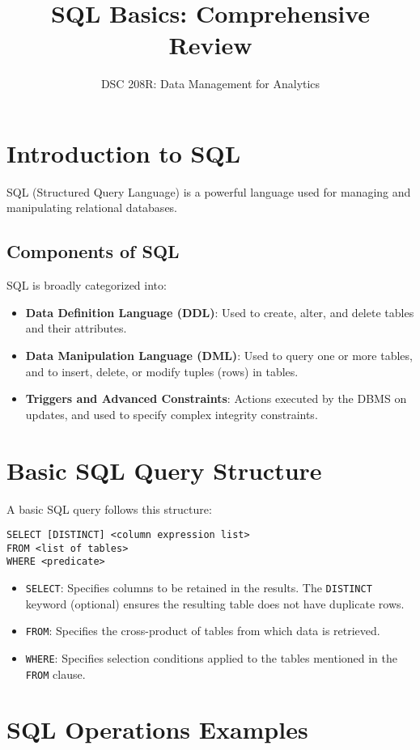 \documentclass{article}
\title{SQL Basics: Comprehensive Review}
\author{DSC 208R: Data Management for Analytics}
\date{}
\begin{document}
\maketitle

\section*{Introduction to SQL}
SQL (Structured Query Language) is a powerful language used for managing and manipulating relational databases.

\subsection*{Components of SQL}
SQL is broadly categorized into:
\begin{itemize}
    \item \textbf{Data Definition Language (DDL)}: Used to create, alter, and delete tables and their attributes.
    \item \textbf{Data Manipulation Language (DML)}: Used to query one or more tables, and to insert, delete, or modify tuples (rows) in tables.
    \item \textbf{Triggers and Advanced Constraints}: Actions executed by the DBMS on updates, and used to specify complex integrity constraints.
\end{itemize}

\section*{Basic SQL Query Structure}
A basic SQL query follows this structure:
\begin{lstlisting}
SELECT [DISTINCT] <column expression list>
FROM <list of tables>
WHERE <predicate>
\end{lstlisting}
\begin{itemize}
    \item \texttt{SELECT}: Specifies columns to be retained in the results. The \texttt{DISTINCT} keyword (optional) ensures the resulting table does not have duplicate rows.
    \item \texttt{FROM}: Specifies the cross-product of tables from which data is retrieved.
    \item \texttt{WHERE}: Specifies selection conditions applied to the tables mentioned in the \texttt{FROM} clause.
\end{itemize}

\section*{SQL Operations Examples}
\end{document}
